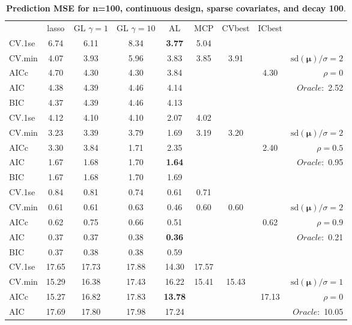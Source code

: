 \clearpage
\begin{table}\vspace{-.5cm}
\caption[l]{ { \bf Prediction MSE for n=100, continuous design, 
sparse covariates, and  decay  100}.}
\vspace{-.5cm}
\footnotesize{}
\begin{center}
\begin{tabular}{l*{7}{c}|r}
 & lasso & GL $\gamma=1$ & GL $\gamma=10$ & AL & MCP  & CVbest & ICbest  \\
\cline{1-9}
CV.1se & 6.74 & 6.11 & 8.34 & {\bf 3.77} & 5.04 & & & \\
CV.min & 4.07 & 3.93 & 5.96 & 3.83 & 3.85 & 3.91 & & $\mathrm{sd}(\mathbf{\mu})/\sigma=2$ \\
AICc & 4.70 & 4.30 & 4.30 & 3.84 & & & 4.30 &  $\rho=0$ \\
AIC & 4.38 & 4.39 & 4.46 & 4.14 & & & &  \multirow{2}{*}{$Oracle: $ 2.52} \\
BIC & 4.37 & 4.39 & 4.46 & 4.13 & & & &  \\
 \hline 
CV.1se & 4.12 & 4.10 & 4.10 & 2.07 & 4.02 & & & \\
CV.min & 3.23 & 3.39 & 3.79 & 1.69 & 3.19 & 3.20 & & $\mathrm{sd}(\mathbf{\mu})/\sigma=2$ \\
AICc & 3.30 & 3.84 & 1.71 & 2.35 & & & 2.40 &  $\rho=0.5$ \\
AIC & 1.67 & 1.68 & 1.70 & {\bf 1.64} & & & &  \multirow{2}{*}{$Oracle: $ 0.95} \\
BIC & 1.67 & 1.68 & 1.70 & 1.69 & & & &  \\
 \hline 
CV.1se & 0.84 & 0.81 & 0.74 & 0.61 & 0.71 & & & \\
CV.min & 0.61 & 0.61 & 0.63 & 0.46 & 0.60 & 0.60 & & $\mathrm{sd}(\mathbf{\mu})/\sigma=2$ \\
AICc & 0.62 & 0.75 & 0.66 & 0.51 & & & 0.62 &  $\rho=0.9$ \\
AIC & 0.37 & 0.37 & 0.38 & {\bf 0.36} & & & &  \multirow{2}{*}{$Oracle: $ 0.21} \\
BIC & 0.37 & 0.38 & 0.38 & 0.59 & & & &  \\
 \hline 
CV.1se & 17.65 & 17.73 & 17.88 & 14.30 & 17.57 & & & \\
CV.min & 15.29 & 16.38 & 17.43 & 16.22 & 15.41 & 15.43 & & $\mathrm{sd}(\mathbf{\mu})/\sigma=1$ \\
AICc & 15.27 & 16.82 & 17.83 & {\bf 13.78} & & & 17.13 &  $\rho=0$ \\
AIC & 17.69 & 17.80 & 17.98 & 17.24 & & & &  \multirow{2}{*}{$Oracle: $ 10.05} \\

\end{tabular}
\end{center}
\end{table}
